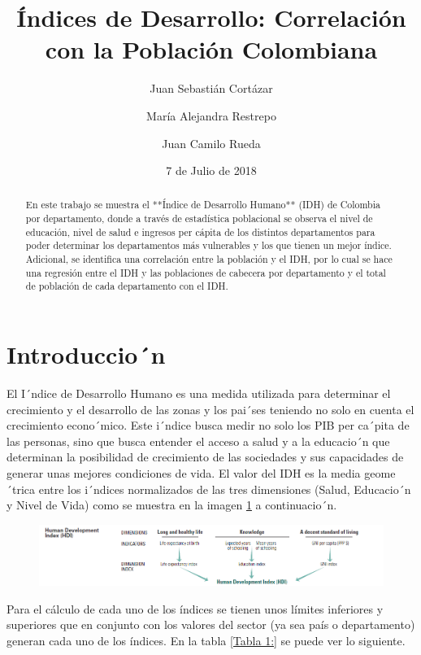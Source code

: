 \documentclass{article}
\title{Índices de Desarrollo: Correlación con la Población Colombiana}
\author[1]{\normalsize Juan Sebastián Cortázar}
\author[2]{\normalsize María Alejandra Restrepo}
\author[3]{\normalsize Juan Camilo Rueda}
\affil[1,2,3]{\small  Universidad de los Andes\\
\texttt{{js.cortazar533,ma.restrepot,jc.rueda169}@uniandes.edu.col}}
\date{7 de Julio de 2018}
\begin{document}


\maketitle


\begin{abstract}

En este trabajo se muestra el **Índice de Desarrollo Humano** (IDH) de Colombia por departamento, donde a través de estadística poblacional se observa el nivel de educación, nivel de salud e ingresos per cápita de los distintos departamentos para poder determinar los departamentos más vulnerables y los que tienen un mejor índice. Adicional, se identifica una correlación entre la población y el IDH, por lo cual se hace una regresión entre el IDH y las poblaciones de cabecera por departamento y el total de población de cada departamento con el IDH.

\end{abstract}

\section*{Introduccio´n}

El I´ndice de Desarrollo Humano es una medida utilizada para determinar el crecimiento y el desarrollo de las zonas y los pai´ses teniendo no solo en cuenta el crecimiento econo´mico. Este i´ndice busca medir no solo los PIB per ca´pita de las personas, sino que busca entender el acceso a salud y a la educacio´n que determinan la posibilidad de crecimiento de las sociedades y sus capacidades de generar unas mejores condiciones de vida. 
El valor del IDH es la media geome´trica entre los i´ndices normalizados de las tres dimensiones (Salud, Educacio´n y Nivel de Vida) como se muestra en la imagen \ref{IDH} a continuacio´n. 


\begin{figure}[h]
\centering
\includegraphics{hdiCalc}
\label {IDH}
\end{figure}

Para el cálculo de cada uno de los índices se tienen unos límites inferiores y superiores que en conjunto con los valores del sector (ya sea país o departamento) generan cada uno de los índices. En la tabla \ref{Tabla 1:} se puede ver lo siguiente.
\end{document}
